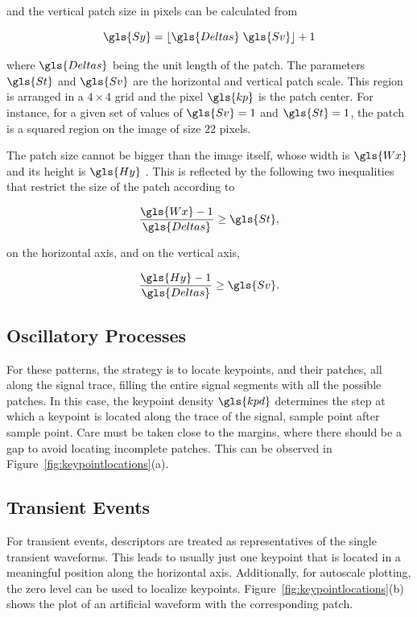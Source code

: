 \noindent and the vertical patch size in pixels can be calculated from

\begin{equation}
\gls{Sy} = \lfloor \gls{Deltas} \; \gls{Sv} \rfloor + 1
\label{eq:sy}
\end{equation}

\noindent where $\gls{Deltas}$ being the unit length of the patch. The parameters $\gls{St}$  and $\gls{Sv}$ are the horizontal and vertical patch scale. This region is arranged in a $4 \times 4$ grid and the pixel $\gls{kp}$ is the patch center.   For instance, for a given set of values of $\gls{Sv} = 1$ and $\gls{St} = 1$, the patch is a squared region on the image of size $22$ pixels.

The patch size cannot be bigger than the image itself, whose width is $\gls{Wx}$ and its height is $\gls{Hy}$ .  This is reflected by the following two inequalities that restrict the size of the patch according to 

\begin{equation}
\frac{\gls{Wx}-1}{\gls{Deltas}}  \geq \gls{St} ,
\label{eq:restriction1}
\end{equation}

\noindent on the horizontal axis, and on the vertical axis, 

\begin{equation}
\frac{\gls{Hy}-1}{\gls{Deltas}}  \geq \gls{Sv}.
\label{eq:restriction2}
\end{equation}

\subsection{Oscillatory Processes}

For these patterns, the strategy is to locate keypoints, and their patches, all along the signal trace, filling the entire signal segments with all the possible patches.  In this case, the keypoint density $\gls{kpd} $ determines the step at which a keypoint is located along the trace of the signal, sample point after sample point. Care must be taken close to the margins, where there should be a gap to avoid locating incomplete patches.  This can be observed in Figure~\ref{fig:keypointlocations}(a).

\subsection{Transient Events}

For transient events, descriptors are treated as representatives of the single transient waveforms.  This leads to usually just one keypoint that is located in a meaningful position along the horizontal axis.  Additionally, for autoscale plotting, the zero level can be used to localize keypoints. Figure~\ref{fig:keypointlocations}(b) shows the plot of an artificial waveform with the corresponding patch.

